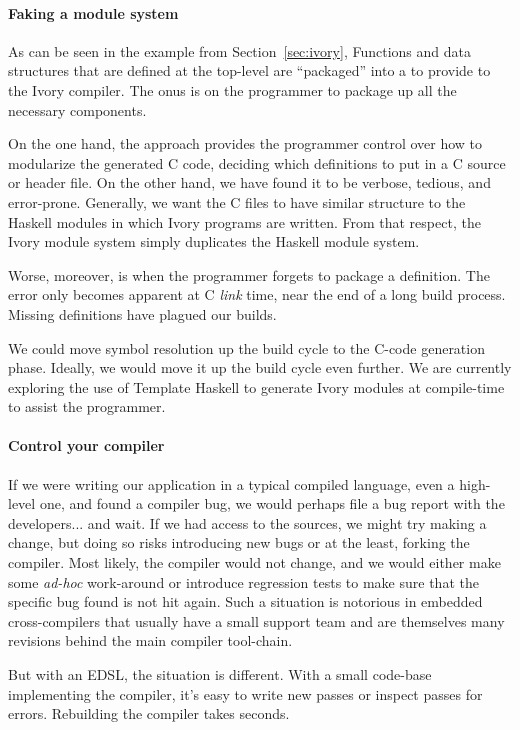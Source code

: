 \paragraph{Faking a module system}
As can be seen in the example from Section~\ref{sec:ivory}, Functions and data
structures that are defined at the top-level are ``packaged'' into a 
to provide to the Ivory compiler.  The onus is on the programmer to package up
all the necessary components.

On the one hand, the approach provides the programmer control over how to
modularize the generated C code, deciding which definitions to put in a C
source or header file.  On the other hand, we have found it to be verbose,
tedious, and error-prone.  Generally, we want the C files to have similar
structure to the Haskell modules in which Ivory programs are written.  From that
respect, the Ivory module system simply duplicates the Haskell module system.

Worse, moreover, is when the programmer forgets to package a definition.  The
error only becomes apparent at C \emph{link} time, near the end of a long build
process.  Missing definitions have plagued our builds.

We could move symbol resolution up the build cycle to the C-code generation
phase.  Ideally, we would move it up the build cycle even further.  We are
currently exploring the use of Template Haskell to generate Ivory modules at
compile-time to assist the programmer.

\paragraph{Control your compiler}
If we were writing our application in a typical compiled language, even a
high-level one, and found a compiler bug, we would perhaps file a bug
report with the developers... and wait.  If we had access to the sources, we
might try making a change, but doing so risks introducing new bugs or at the
least, forking the compiler.  Most likely, the compiler would not change, and we
would either make some \emph{ad-hoc} work-around or introduce regression tests
to make sure that the specific bug found is not hit again.  Such a situation is
notorious in embedded cross-compilers that usually have a small support team and
are themselves many revisions behind the main compiler tool-chain.

But with an EDSL, the situation is different.  With a small code-base
implementing the compiler, it’s easy to write new passes or inspect passes for
errors.  Rebuilding the compiler takes seconds.

